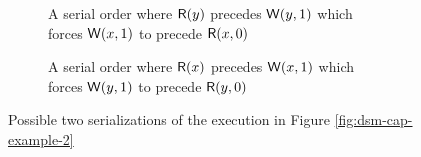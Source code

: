 \documentclass[]             %
{NASA}                       %
\theoremstyle{definition}
\begin{document}
\begin{figure}
  \setlength\belowcaptionskip{5ex}
  \begin{subfigure}{1\textwidth}
    \centering
    
    \caption{A serial order where $\mathsf{R}\!\left(y\right)$ precedes $\mathsf{W}\!\left(y, 1\right)$ which forces $\mathsf{W}\!\left(x, 1\right)$ to precede $\mathsf{R}\!\left(x, 0\right)$}
    \label{fig:dsm-cap-example-2-serial1}
  \end{subfigure}
  \begin{subfigure}{1\textwidth}
    \centering
    
    \caption{A serial order where $\mathsf{R}\!\left(x\right)$ precedes $\mathsf{W}\!\left(x, 1\right)$ which forces $\mathsf{W}\!\left(y, 1\right)$ to precede $\mathsf{R}\!\left(y, 0\right)$}
    \label{fig:dsm-cap-example-2-serial2}
  \end{subfigure}
  \caption{Possible two serializations of the execution in Figure \ref{fig:dsm-cap-example-2}}
  \label{fig:dsm-cap-example-2-serial}
\end{figure}
\end{document}
